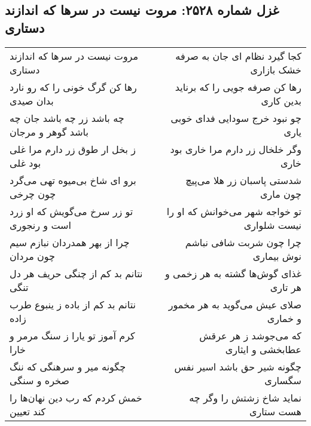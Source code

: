 \begin{center}
\section*{غزل شماره ۲۵۲۸: مروت نیست در سرها که اندازند دستاری}
\label{sec:2528}
\begin{longtable}{l p{0.5cm} r}
مروت نیست در سرها که اندازند دستاری
&&
کجا گیرد نظام ای جان به صرفه خشک بازاری
\\
رها کن گرگ خونی را که رو نارد بدان صیدی
&&
رها کن صرفه جویی را که برناید بدین کاری
\\
چه باشد زر چه باشد جان چه باشد گوهر و مرجان
&&
چو نبود خرج سودایی فدای خوبی یاری
\\
ز بخل ار طوق زر دارم مرا غلی بود غلی
&&
وگر خلخال زر دارم مرا خاری بود خاری
\\
برو ای شاخ بی‌میوه تهی می‌گرد چون چرخی
&&
شدستی پاسبان زر هلا می‌پیچ چون ماری
\\
تو زر سرخ می‌گویش که او زرد است و رنجوری
&&
تو خواجه شهر می‌خوانش که او را نیست شلواری
\\
چرا از بهر همدردان نبازم سیم چون مردان
&&
چرا چون شربت شافی نباشم نوش بیماری
\\
نتانم بد کم از چنگی حریف هر دل تنگی
&&
غذای گوش‌ها گشته به هر زخمی و هر تاری
\\
نتانم بد کم از باده ز ینبوع طرب زاده
&&
صلای عیش می‌گوید به هر مخمور و خماری
\\
کرم آموز تو یارا ز سنگ مرمر و خارا
&&
که می‌جوشد ز هر عرقش عطابخشی و ایثاری
\\
چگونه میر و سرهنگی که ننگ صخره و سنگی
&&
چگونه شیر حق باشد اسیر نفس سگساری
\\
خمش کردم که رب دین نهان‌ها را کند تعیین
&&
نماید شاخ زشتش را وگر چه هست ستاری
\\
\end{longtable}
\end{center}

